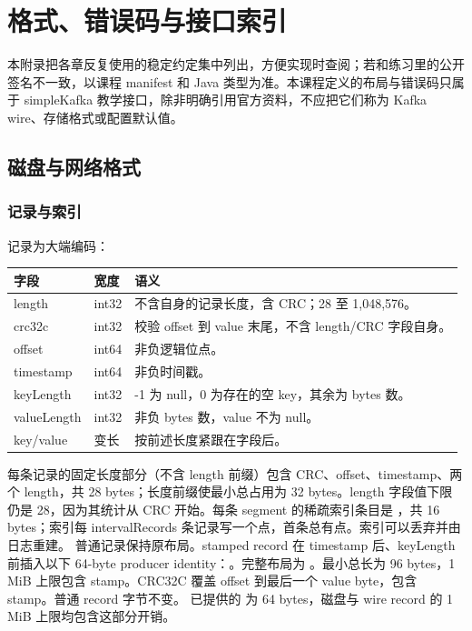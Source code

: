 \chapter{格式、错误码与接口索引}
本附录把各章反复使用的稳定约定集中列出，方便实现时查阅；若和练习里的公开签名不一致，以课程 manifest 和 Java 类型为准。本课程定义的布局与错误码只属于 simpleKafka 教学接口，除非明确引用官方资料，不应把它们称为 Kafka wire、存储格式或配置默认值。

\section{磁盘与网络格式}
\subsection{记录与索引}
记录为大端编码：
\begin{center}
\begin{tabular}{p{}p{}p{}}
\toprule
字段 & 宽度 & 语义 \\
\midrule
length & int32 & 不含自身的记录长度，含 CRC；28 至 1,048,576。\\
crc32c & int32 & 校验 offset 到 value 末尾，不含 length/CRC 字段自身。\\
offset & int64 & 非负逻辑位点。\\
timestamp & int64 & 非负时间戳。\\
keyLength & int32 & -1 为 null，0 为存在的空 key，其余为 bytes 数。\\
valueLength & int32 & 非负 bytes 数，value 不为 null。\\
key/value & 变长 & 按前述长度紧跟在字段后。\\
\bottomrule
\end{tabular}
\end{center}
每条记录的固定长度部分（不含 length 前缀）包含 CRC、offset、timestamp、两个 length，共 28 bytes；长度前缀使最小总占用为 32 bytes。length 字段值下限仍是 28，因为其统计从 CRC 开始。每条 segment 的稀疏索引条目是 ，共 16 bytes；索引每 intervalRecords 条记录写一个点，首条总有点。索引可以丢弃并由日志重建。
普通记录保持原布局。stamped record 在 timestamp 后、keyLength 前插入以下 64-byte producer identity：。完整布局为 。最小总长为 96 bytes，1 MiB 上限包含 stamp。CRC32C 覆盖 offset 到最后一个 value byte，包含 stamp。普通 record 字节不变。
已提供的  为 64 bytes，磁盘与  wire record 的 1 MiB 上限均包含这部分开销。

